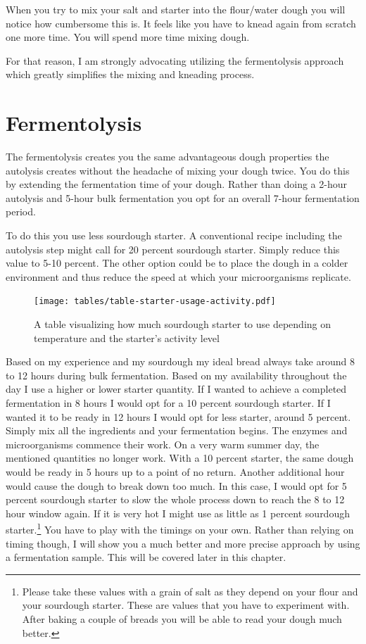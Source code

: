 When you try to mix your salt and starter into the flour/water dough you will
notice how cumbersome this is. It feels like you have to knead again from scratch
one more time. You will spend more time mixing dough.

For that reason, I am strongly advocating utilizing the fermentolysis approach
which greatly simplifies the mixing and kneading process.

\section{Fermentolysis}
\label{section:fermentolysis}

The fermentolysis creates you the same advantageous dough properties the
autolysis creates without the headache of mixing your dough twice. You do this
by extending the fermentation time of your dough. Rather than doing a 2-hour
autolysis and 5-hour bulk fermentation you opt for an overall 7-hour
fermentation period.

To do this you use less sourdough starter. A conventional recipe including the
autolysis step might call for 20 percent sourdough starter. Simply reduce this
value to 5-10 percent. The other option could be to place the dough in a colder
environment and thus reduce the speed at which your microorganisms replicate.

\begin{figure}[!htb]
  \texttt{[image: tables/table-starter-usage-activity.pdf]}
  \caption{A table visualizing how much sourdough starter to use depending on temperature and the starter's activity level}
\end{figure}

Based on my experience and my sourdough my ideal bread always take around 8
to 12 hours during bulk fermentation. Based on my availability throughout
the day I use a higher or lower starter quantity. If I wanted to achieve a completed
fermentation in 8 hours I would opt for a 10 percent sourdough starter. If I
wanted it to be ready in 12 hours I would opt for less starter, around 5 percent.
Simply mix all the ingredients and your fermentation begins. The
enzymes and microorganisms commence their work. On a very warm summer day, the
mentioned quantities no longer work. With a 10 percent starter, the same dough
would be ready in 5 hours up to a point of no return. Another additional hour
would cause the dough to break down too much. In this case, I would opt for 5
percent sourdough starter to slow the whole process down to reach the 8 to 12
hour window again. If it is very hot I might use as little as 1 percent
sourdough starter.\footnote{Please take these values with a grain of salt as
they depend on your flour and your sourdough starter. These are values that
you have to experiment with. After baking a couple of breads you will be able
to read your dough much better.} You have to play with the timings on your own.
Rather than relying on timing though, I will show you a much better and more precise approach
by using a fermentation sample. This will be covered later in this chapter.

